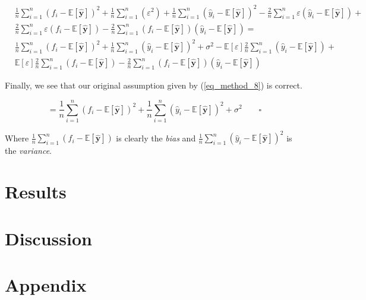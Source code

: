 \documentclass[a4paper,10pt,english]{article}
\begin{document}
	\begin{align*}	
	& \frac{1}{n} \sum_{i=1}^{n} ( f_i - \mathbb{E}[\hat{\mathbf{y}}] )^2 
	+ \frac{1}{n} \sum_{i=1}^{n} ( \varepsilon^2 )
	+ \frac{1}{n} \sum_{i=1}^{n} ( \hat{y}_i - \mathbb{E}[\hat{\mathbf{y}}] )^2 
	- \frac{2}{n} \sum_{i=1}^{n} \varepsilon ( \hat{y}_i - \mathbb{E}[\hat{\mathbf{y}}] )
	+ \\ &\frac{2}{n} \sum_{i=1}^{n} \varepsilon ( f_i - \mathbb{E}[\hat{\mathbf{y}}] )
	- \frac{2}{n} \sum_{i=1}^{n} ( f_i - \mathbb{E}[\hat{\mathbf{y}}] ) ( \hat{y}_i - \mathbb{E}[\hat{\mathbf{y}}] )
	= \\ & \frac{1}{n} \sum_{i=1}^{n} ( f_i - \mathbb{E}[\hat{\mathbf{y}}] )^2 
	+ \frac{1}{n} \sum_{i=1}^{n} ( \hat{y}_i - \mathbb{E}[\hat{\mathbf{y}}] )^2 
	+ \sigma^2
	- \mathbb{E}[\varepsilon] \frac{2}{n} \sum_{i=1}^{n} ( \hat{y}_i - \mathbb{E}[\hat{\mathbf{y}}] )
	+ \\ & \mathbb{E}[\varepsilon] \frac{2}{n} \sum_{i=1}^{n} ( f_i - \mathbb{E}[\hat{\mathbf{y}}] )
	-\frac{2}{n} \sum_{i=1}^{n} ( f_i - \mathbb{E}[\hat{\mathbf{y}}] ) ( \hat{y}_i - \mathbb{E}[\hat{\mathbf{y}}] )
	\end{align*}
	
	Finally, we see that our original assumption given by (\ref{eq_method_8}) is correct.
	
	\begin{equation*}
	= \frac{1}{n} \sum_{i=1}^{n} ( f_i - \mathbb{E}[\hat{\mathbf{y}}] )^2 
	+ \frac{1}{n} \sum_{i=1}^{n} ( \hat{y}_i - \mathbb{E}[\hat{\mathbf{y}}] )^2 
	+ \sigma^2 \qquad \square
	\end{equation*}
	
	Where $\frac{1}{n} \sum_{i=1}^{n} ( f_i - \mathbb{E}[\hat{\mathbf{y}}] )$ is clearly the \textit{bias} and
	$\frac{1}{n} \sum_{i=1}^{n} ( \hat{y}_i - \mathbb{E}[\hat{\mathbf{y}}] )^2$ is the \textit{variance}. 
		
\section*{Results}
\label{sec:results}

\section*{Discussion}
\label{sec:discussion}

\newpage

\section*{Appendix}
\label{sec:appendix}

{}

	
\end{document}
